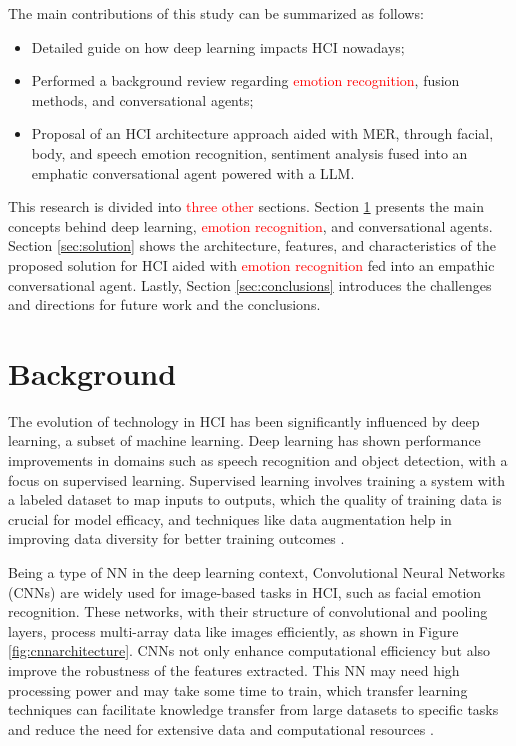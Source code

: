 \documentclass[runningheads]{llncs}
\begin{document}
The main contributions of this study can be summarized as follows:
\begin{itemize}
	\item Detailed guide on how deep learning impacts HCI nowadays;
	\item Performed a background review regarding \textcolor{red}{emotion recognition}, fusion methods, and conversational agents;
	\item  Proposal of an HCI architecture approach aided with MER, through facial, body, and speech emotion recognition, sentiment analysis fused into an emphatic conversational agent powered with a LLM.
\end{itemize}

This research is divided into \textcolor{red}{three other} sections. Section \ref{sec:background} presents the main concepts behind deep learning, \textcolor{red}{emotion recognition}, and conversational agents. Section \ref{sec:solution} shows the architecture, features, and characteristics of the proposed solution for HCI aided with \textcolor{red}{emotion recognition} fed into an empathic conversational agent. Lastly, Section \ref{sec:conclusions}  introduces the challenges and directions for future work and the conclusions. 

\section{Background}
\label{sec:background}

The evolution of technology in HCI has been significantly influenced by deep learning, a subset of machine learning. Deep learning has shown performance improvements in domains such as speech recognition and object detection, with a focus on supervised learning. Supervised learning involves training a system with a labeled dataset to map inputs to outputs, which the quality of training data is crucial for model efficacy, and techniques like data augmentation help in improving data diversity for better training outcomes \cite{Lecun2015, Alrowais2023, Benitez2021}.

Being a type of NN in the deep learning context, Convolutional Neural Networks (CNNs) are widely used for image-based tasks in HCI, such as facial emotion recognition. These networks, with their structure of convolutional and pooling layers, process multi-array data like images efficiently, as shown in Figure \ref{fig:cnnarchitecture}. CNNs not only enhance computational efficiency but also improve the robustness of the features extracted. This NN may need high processing power and may take some time to train, which transfer learning techniques can facilitate knowledge transfer from large datasets to specific tasks and reduce the need for extensive data and computational resources \cite{Lecun2015, Khan2020}.
\end{document}
